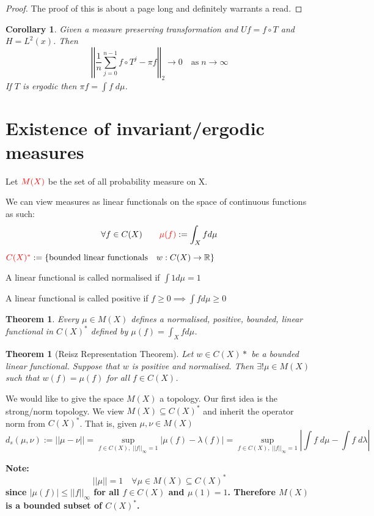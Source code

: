 \documentclass[11pt]{article}
\newcommand{\defeq}{:=}
\newcommand{\abs}[1]{\left|#1\right|}
\newcommand{\norm}[1]{\left|\left|#1\right|\right|}
\newcommand{\R}{\mathbb{R}}
\newenvironment{defin}
	{\begin{mdframed}[backgroundcolor=white, roundcorner=5pt, linewidth=1pt]}
	{\end{mdframed}}
\newcommand{\mdf}[1]{{\color{red} #1}}
\newenvironment{note}
	{\begin{mdframed}[backgroundcolor=white, linecolor=red, roundcorner=5pt, linewidth=1pt]\bfseries{Note:}\normalfont}
	{\end{mdframed}}
\newtheorem{theorem}[prop]{Theorem}
\newtheorem{cor}[prop]{Corollary}
\begin{document}
\begin{proof}
The proof of this is about a page long and definitely warrants a read.
\end{proof}

\begin{cor}
	Given a measure preserving transformation and $Uf=f\circ T$ and $H=L^2(x)$. Then
	\[
		\norm{\frac{1}{n}\sum_{j=0}^{n-1}f\circ T^j - \pi f}_2 \to 0 \quad \text{as} \; n\to\infty
	\]
	If $T$ is ergodic then $\pi f = \int f\; d\mu$.
\end{cor}

\section{Existence of invariant/ergodic measures}
\begin{defin}
Let $\mdf{M(X)}$ be the set of all probability measure on X.

We can view measures as linear functionals on the space of continuous functions as such:
$$\forall f\in C(X)\quad\quad \mdf{\mu(f)}\defeq\int_X f d\mu$$

$\mdf{C(X)^*}\defeq\{\text{bounded linear functionals}\quad w:C(X)\to\R\}$

A linear functional is called \mdf{normalised} if $\int 1 d\mu =1$

A linear functional is called \mdf{positive} if $f\geq 0\implies \int f d\mu \geq 0$
\end{defin}
\begin{theorem}
	Every $\mu\in M(X)$ defines a normalised, positive, bounded, linear functional in $C(X)^*$ defined by $\mu(f)=\int_X f d\mu$.
\end{theorem}
\begin{theorem}[Reisz Representation Theorem]
	Let $w\in C(X)*$ be a bounded linear functional. Suppose that $w$ is positive and normalised. Then $\exists !\mu\in M(X)$ such that $w(f)=\mu(f)$ for all $f\in C(X)$.
\end{theorem}

We would like to give the space $M(X)$ a topology.
Our first idea is the \mdf{strong/norm topology}.
We view $M(X) \subseteq C(X)^\ast$ and inherit the operator norm from $C(X)^\ast$.
That is, given $\mu, \nu \in M(X)$
\[
	d_s(\mu, \nu) \defeq \norm{\mu - \nu} = \sup_{f\in C(X) , \; \norm{f}_\infty=1}\abs{\mu(f)- \lambda(f)} = \sup_{f\in C(X) , \; \norm{f}_\infty=1} \abs{\int f \;d\mu - \int f \; d\lambda}
\]

\begin{note}
	\[
 		\norm{\mu} =1 \quad \forall \mu \in M(X) \subseteq C(X)^\ast
	\]
	since $\abs{\mu(f)}\leq\norm{f}_\infty$ for all $f\in C(X)$ and $\mu(1)=1$.
	Therefore $M(X)$ is a bounded subset of $C(X)^\ast$.
\end{note}
\end{document}
